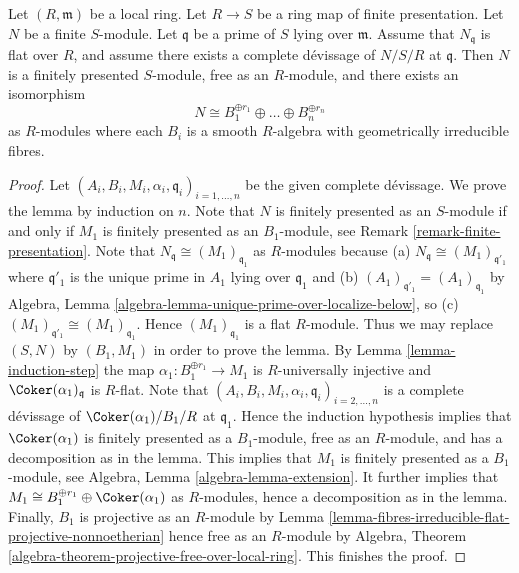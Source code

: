 \begin{lemma}
\label{lemma-complete-devissage-flat-finite-type-module}
Let $(R, \mathfrak m)$ be a local ring.
Let $R \to S$ be a ring map of finite presentation.
Let $N$ be a finite $S$-module.
Let $\mathfrak q$ be a prime of $S$ lying over $\mathfrak m$.
Assume that $N_{\mathfrak q}$ is flat over $R$, and
assume there exists a complete d\'evissage of $N/S/R$ at $\mathfrak q$.
Then $N$ is a finitely presented $S$-module, free as an $R$-module,
and there exists an isomorphism
$$
N \cong B_1^{\oplus r_1} \oplus \ldots \oplus B_n^{\oplus r_n}
$$
as $R$-modules where each $B_i$ is a smooth $R$-algebra with geometrically
irreducible fibres.
\end{lemma}

\begin{proof}
Let $(A_i, B_i, M_i, \alpha_i, \mathfrak q_i)_{i = 1, \ldots, n}$
be the given complete d\'evissage. We prove the lemma by induction on $n$.
Note that $N$ is finitely presented as an $S$-module if and only if
$M_1$ is finitely presented as an $B_1$-module, see
Remark \ref{remark-finite-presentation}.
Note that $N_{\mathfrak q} \cong (M_1)_{\mathfrak q_1}$ as $R$-modules
because (a) $N_{\mathfrak q} \cong (M_1)_{\mathfrak q'_1}$ where
$\mathfrak q'_1$ is the unique prime in $A_1$ lying over $\mathfrak q_1$
and (b) $(A_1)_{\mathfrak q'_1} = (A_1)_{\mathfrak q_1}$ by
Algebra, Lemma \ref{algebra-lemma-unique-prime-over-localize-below},
so (c) $(M_1)_{\mathfrak q'_1} \cong (M_1)_{\mathfrak q_1}$.
Hence $(M_1)_{\mathfrak q_1}$ is a flat $R$-module. Thus we may replace
$(S, N)$ by $(B_1, M_1)$ in order to prove the lemma. By
Lemma \ref{lemma-induction-step}
the map $\alpha_1 : B_1^{\oplus r_1} \to M_1$ is $R$-universally injective
and $\Coker(\alpha_1)_{\mathfrak q}$ is $R$-flat.
Note that $(A_i, B_i, M_i, \alpha_i, \mathfrak q_i)_{i = 2, \ldots, n}$
is a complete d\'evissage of $\Coker(\alpha_1)/B_1/R$ at
$\mathfrak q_1$. Hence the induction hypothesis
implies that $\Coker(\alpha_1)$ is finitely presented as a
$B_1$-module, free as an $R$-module, and has a decomposition as in the lemma.
This implies that $M_1$ is finitely presented as a $B_1$-module, see
Algebra, Lemma \ref{algebra-lemma-extension}.
It further implies that
$M_1 \cong B_1^{\oplus r_1} \oplus \Coker(\alpha_1)$
as $R$-modules, hence a decomposition as in the lemma.
Finally, $B_1$ is projective as an $R$-module by
Lemma \ref{lemma-fibres-irreducible-flat-projective-nonnoetherian}
hence free as an $R$-module by
Algebra, Theorem \ref{algebra-theorem-projective-free-over-local-ring}.
This finishes the proof.
\end{proof}
